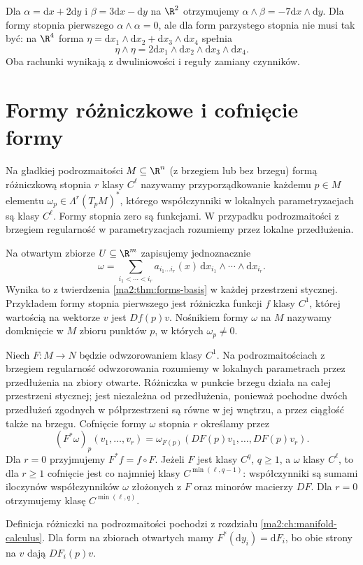 \begin{przyklad}
Dla $\alpha=\mathrm dx+2\mathrm dy$ i
$\beta=3\mathrm dx-\mathrm dy$ na $\R^2$
otrzymujemy $\alpha\wedge\beta=-7\mathrm dx\wedge
\mathrm dy$. Dla formy stopnia pierwszego
$\alpha\wedge\alpha=0$, ale dla form parzystego
stopnia nie musi tak być: na $\R^4$ forma
$\eta=\mathrm dx_1\wedge\mathrm dx_2+
\mathrm dx_3\wedge\mathrm dx_4$ spełnia
\[
 \eta\wedge\eta=2\mathrm dx_1\wedge\mathrm dx_2
 \wedge\mathrm dx_3\wedge\mathrm dx_4.
\]
Oba rachunki wynikają z dwuliniowości i reguły
zamiany czynników.
\end{przyklad}

\section{Formy różniczkowe i cofnięcie formy}

\begin{definicja}
\label{ma2:def:differential-form}
Na gładkiej podrozmaitości $M\subseteq\R^n$
(z brzegiem lub bez brzegu) formą różniczkową stopnia $r$ klasy $C^\ell$
nazywamy przyporządkowanie każdemu $p\in M$
elementu $\omega_p\in\Lambda^r(T_pM)^*$,
którego współczynniki w lokalnych parametryzacjach
są klasy $C^\ell$. Formy stopnia zero są funkcjami.
W przypadku podrozmaitości z brzegiem regularność
w parametryzacjach rozumiemy przez lokalne przedłużenia.
\end{definicja}

Na otwartym zbiorze $U\subseteq\R^m$ zapisujemy
jednoznacznie
\[
 \omega=\sum_{i_1<\cdots<i_r} a_{i_1\ldots i_r}(x)
 \,\mathrm dx_{i_1}\wedge\cdots\wedge\mathrm dx_{i_r}.
\]
Wynika to z twierdzenia \ref{ma2:thm:forms-basis}
w każdej przestrzeni stycznej.
Przykładem formy stopnia pierwszego jest różniczka
funkcji $f$ klasy $C^1$, której wartością na wektorze
$v$ jest $Df(p)v$.
Nośnikiem formy $\omega$ na $M$ nazywamy
domknięcie w $M$ zbioru punktów $p$, w których
$\omega_p\ne0$.

\begin{definicja}
\label{ma2:def:form-pullback}
Niech $F:M\to N$ będzie odwzorowaniem klasy $C^1$.
Na podrozmaitościach z brzegiem regularność
odwzorowania rozumiemy w lokalnych parametrach
przez przedłużenia na zbiory otwarte.
Różniczka w punkcie brzegu działa na całej
przestrzeni stycznej; jest niezależna od
przedłużenia, ponieważ pochodne dwóch przedłużeń
zgodnych w półprzestrzeni są równe w jej wnętrzu,
a przez ciągłość także na brzegu.
Cofnięcie formy $\omega$ stopnia $r$ określamy przez
\[
 (F^*\omega)_p(v_1,\ldots,v_r)=
 \omega_{F(p)}(DF(p)v_1,\ldots,DF(p)v_r).
\]
Dla $r=0$ przyjmujemy $F^*f=f\circ F$.
Jeżeli $F$ jest klasy $C^q$, $q\ge1$, a $\omega$
klasy $C^\ell$, to dla $r\ge1$ cofnięcie jest
co najmniej klasy $C^{\min(\ell,q-1)}$:
współczynniki są sumami iloczynów współczynników
$\omega$ złożonych z $F$ oraz minorów macierzy $DF$.
Dla $r=0$ otrzymujemy klasę $C^{\min(\ell,q)}$.
\end{definicja}
Definicja różniczki na podrozmaitości pochodzi
z rozdziału \ref{ma2:ch:manifold-calculus}.
Dla form na zbiorach otwartych mamy
$F^*(\mathrm dy_i)=\mathrm dF_i$,
bo obie strony na $v$ dają $DF_i(p)v$.


